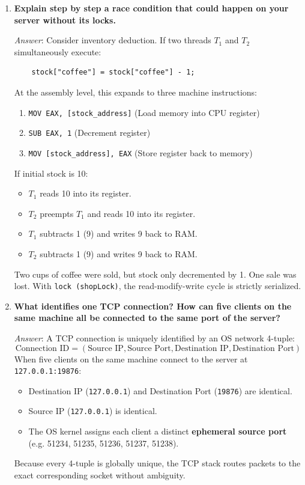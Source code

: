 \documentclass[11pt,a4paper]{article}
\begin{document}
\begin{enumerate}[label=\textbf{Control Q\arabic*.},leftmargin=*]
    \item \textbf{Explain step by step a race condition that could happen on your server without its locks.}
    
    \textit{Answer}: Consider inventory deduction. If two threads $T_1$ and $T_2$ simultaneously execute:
    \begin{verbatim}
    stock["coffee"] = stock["coffee"] - 1;
    \end{verbatim}
    At the assembly level, this expands to three machine instructions:
    \begin{enumerate}
        \item \texttt{MOV EAX, [stock\_address]} (Load memory into CPU register)
        \item \texttt{SUB EAX, 1} (Decrement register)
        \item \texttt{MOV [stock\_address], EAX} (Store register back to memory)
    \end{enumerate}
    If initial stock is 10:
    \begin{itemize}
        \item $T_1$ reads 10 into its register.
        \item $T_2$ preempts $T_1$ and reads 10 into its register.
        \item $T_1$ subtracts 1 (9) and writes 9 back to RAM.
        \item $T_2$ subtracts 1 (9) and writes 9 back to RAM.
    \end{itemize}
    Two cups of coffee were sold, but stock only decremented by 1. One sale was lost. With \texttt{lock (shopLock)}, the read-modify-write cycle is strictly serialized.

    \item \textbf{What identifies one TCP connection? How can five clients on the same machine all be connected to the same port of the server?}
    
    \textit{Answer}: A TCP connection is uniquely identified by an OS network 4-tuple:
    $$\text{Connection ID} = (\text{Source IP}, \text{Source Port}, \text{Destination IP}, \text{Destination Port})$$
    When five clients on the same machine connect to the server at \texttt{127.0.0.1:19876}:
    \begin{itemize}
        \item Destination IP (\texttt{127.0.0.1}) and Destination Port (\texttt{19876}) are identical.
        \item Source IP (\texttt{127.0.0.1}) is identical.
        \item The OS kernel assigns each client a distinct \textbf{ephemeral source port} (e.g. 51234, 51235, 51236, 51237, 51238).
    \end{itemize}
    Because every 4-tuple is globally unique, the TCP stack routes packets to the exact corresponding socket without ambiguity.
\end{enumerate}
\end{document}
